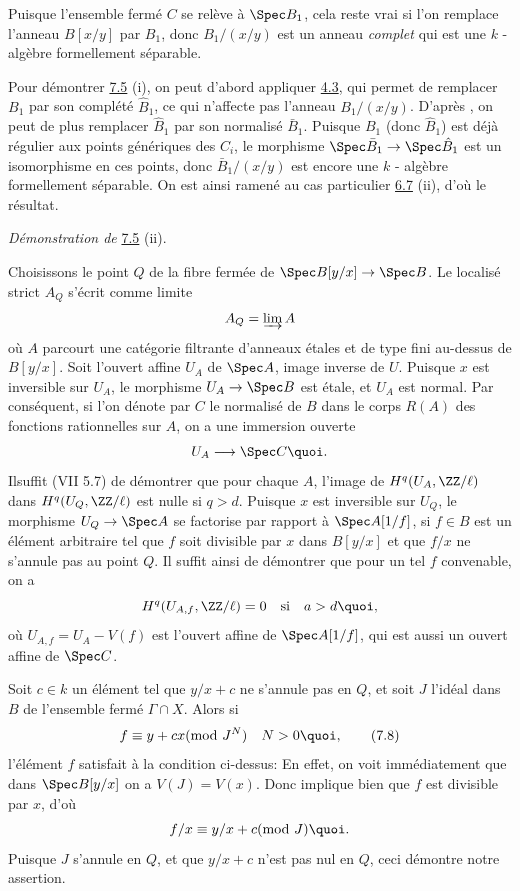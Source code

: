 \documentclass[10pt]{../fichiers-configuration-latex/smfart}
\begin{document}
Puisque l'ensemble fermé $C$ se relève à $\Spec B_{1}$, cela reste
vrai si l'on remplace l'anneau $B[x/y]$ par $B_{1}$, donc
$B_{1}/(x/y)$ est un anneau \emph{complet} qui est une $k$ -algèbre
formellement séparable.

Pour démontrer \hyperref[XIX.lem7.5]{7.5} (i), on peut d'abord appliquer \hyperref[XIX.cor4.3]{4.3}, 
qui permet de
remplacer $B_{1}$ par son complété $\hat{B}_{1}$, ce qui n'affecte pas
l'anneau $B_{1}/(x/y)$. D'après , on peut de plus remplacer
$\hat{B}_{1}$ par son normalisé $\bar{B}_{1}$. Puisque $B_{1}$ (donc
$\hat{B}_{1}$) est déjà régulier aux points génériques des $C_{i}$, le
morphisme $\Spec \bar{B}_{1}\rightarrow \Spec \hat{B}_{1}$ est un
isomorphisme en ces points, donc $\bar{B}_{1}/(x/y)$ est encore une
$k$ - algèbre formellement séparable. On est ainsi ramené au cas
particulier \hyperref[XIX.lem6.7]{6.7} (ii), d'où le résultat.

\medskip
\noindent
\emph{Démonstration de} \hyperref[XIX.lem7.5]{7.5} (ii).

Choisissons le point $Q$ de la fibre fermée de $\Spec
B[y/x]\rightarrow \Spec B$. Le localisé strict $A_{Q}$ s'écrit comme
limite
$$
A_{Q}=\varinjlim A
$$
où $A$ parcourt une catégorie filtrante d'anneaux étales et de type
fini au-dessus de $B[y/x]$. Soit l'ouvert affine $U_{A}$ de $\Spec A$,
image inverse de $U$. Puisque $x$ est inversible sur $U_{A}$, le
morphisme $U_{A}\rightarrow \Spec B$ est étale, et $U_{A}$ est
normal. Par conséquent, si l'on dénote par $C$ le normalisé de $B$
dans le corps $R(A)$ des fonctions rationnelles sur $A$, on a une
immersion ouverte
$$
U_{A}\longrightarrow \Spec C{\quoi}.
$$
Il\pageoriginale suffit (VII 5.7) de démontrer que pour chaque $A$,
l'image de $H^{q}(U_{A},\ZZ/\ell)$ dans
$H^{q}(U_{Q},\ZZ/\ell)$ est nulle si $q>d$. Puisque $x$ est
inversible sur $U_{Q}$, le morphisme $U_{Q}\rightarrow \Spec A$ se
factorise par rapport à $\Spec A[1/f]$, si $f\in B$ est un élément
arbitraire tel que $f$ soit divisible par $x$ dans $B[y/x]$ et que
$f/x$ ne s'annule pas au point $Q$. Il suffit ainsi de démontrer que
pour un tel $f$ convenable, on a
$$
H^{q}(U_{A,f},\ZZ/\ell)=0\quad\text{\rm si}\quad a>d{\quoi},
$$
où $U_{A,f}=U_{A}-V(f)$ est l'ouvert affine de $\Spec A[1/f]$, qui est
aussi un ouvert affine de $\Spec C$.

Soit $c\in k$ un élément tel que $y/x+c$ ne s'annule pas en $Q$, et
soit $J$ l'idéal dans $B$ de l'ensemble fermé $\Gamma\cap X$. Alors si
\begin{equation*}
f\equiv y+cx(\text{\rm mod }J^{N})\quad N>0{\quoi},\tag{7.8}
\end{equation*}
l'élément $f$ satisfait à la condition ci-dessus: En effet, on voit
immédiatement que dans $\Spec B[y/x]$ on a $V(J)=V(x)$. Donc 
implique bien que $f$ est divisible par $x$, d'où
$$
f/x\equiv y/x+c(\text{\rm mod }J){\quoi}.
$$
Puisque $J$ s'annule en $Q$, et que $y/x+c$ n'est pas nul en $Q$, ceci
démontre notre assertion.
\end{document}

